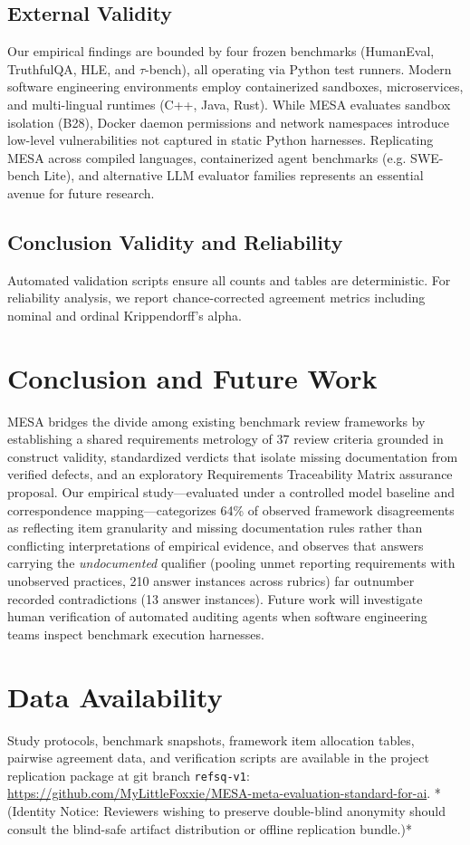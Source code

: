 \documentclass[runningheads]{llncs}
\begin{document}
\subsection{External Validity}
Our empirical findings are bounded by four frozen benchmarks (HumanEval, TruthfulQA, HLE, and $\tau$-bench), all operating via Python test runners. Modern software engineering environments employ containerized sandboxes, microservices, and multi-lingual runtimes (C++, Java, Rust). While MESA evaluates sandbox isolation (B28), Docker daemon permissions and network namespaces introduce low-level vulnerabilities not captured in static Python harnesses. Replicating MESA across compiled languages, containerized agent benchmarks (e.g. SWE-bench Lite), and alternative LLM evaluator families represents an essential avenue for future research.

\subsection{Conclusion Validity and Reliability}
Automated validation scripts ensure all counts and tables are deterministic. For reliability analysis, we report chance-corrected agreement metrics including nominal and ordinal Krippendorff's alpha.

\section{Conclusion and Future Work}
\label{sec:conclusion}

MESA bridges the divide among existing benchmark review frameworks by establishing a shared requirements metrology of 37 review criteria grounded in construct validity, standardized verdicts that isolate missing documentation from verified defects, and an exploratory Requirements Traceability Matrix assurance proposal. Our empirical study---evaluated under a controlled model baseline and correspondence mapping---categorizes 64\% of observed framework disagreements as reflecting item granularity and missing documentation rules rather than conflicting interpretations of empirical evidence, and observes that answers carrying the \emph{undocumented} qualifier (pooling unmet reporting requirements with unobserved practices, 210 answer instances across rubrics) far outnumber recorded contradictions (13 answer instances). Future work will investigate human verification of automated auditing agents when software engineering teams inspect benchmark execution harnesses.

\section*{Data Availability}
Study protocols, benchmark snapshots, framework item allocation tables, pairwise agreement data, and verification scripts are available in the project replication package at git branch \texttt{refsq-v1}: \url{https://github.com/MyLittleFoxxie/MESA-meta-evaluation-standard-for-ai}. *(Identity Notice: Reviewers wishing to preserve double-blind anonymity should consult the blind-safe artifact distribution or offline replication bundle.)*



\end{document}
